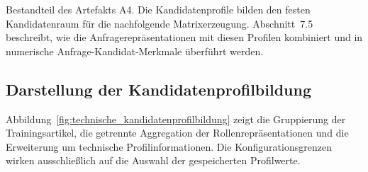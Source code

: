 Bestandteil des Artefakts A4. Die Kandidatenprofile bilden den festen Kandidatenraum für die nachfolgende Matrixerzeugung. Abschnitt~7.5 beschreibt, wie die Anfragerepräsentationen mit diesen Profilen kombiniert und in numerische Anfrage-Kandidat-Merkmale überführt werden. \subsection{Darstellung der Kandidatenprofilbildung} \label{subsec:darstellung_kandidatenprofilbildung} Abbildung~\ref{fig:technische_kandidatenprofilbildung} zeigt die Gruppierung der Trainingsartikel, die getrennte Aggregation der Rollenrepräsentationen und die Erweiterung um technische Profilinformationen. Die Konfigurationsgrenzen wirken ausschließlich auf die Auswahl der gespeicherten Profilwerte. 

